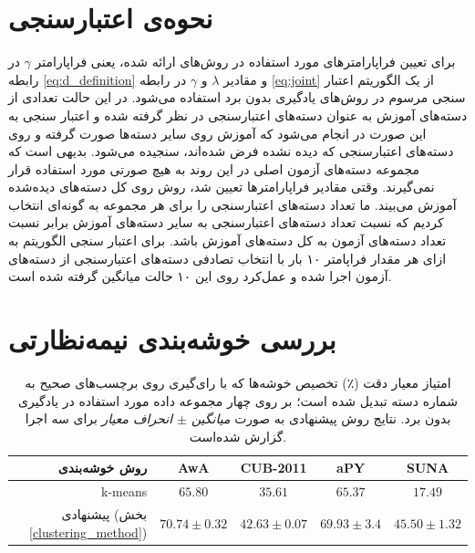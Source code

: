 \section{نحوه‌ی اعتبارسنجی}\label{exp:validation}
برای تعیین فراپارامترهای مورد استفاده در روش‌های ارائه شده، یعنی فراپارامتر $\gamma$ در رابطه \eqref{eq:d_definition} و مقادیر $\lambda$ و $\gamma$ در رابطه \eqref{eq:joint} از یک الگوریتم اعتبار سنجی مرسوم در روش‌های یادگیری بدون برد استفاده می‌شود.
در این حالت تعدادی از دسته‌های آموزش به عنوان دسته‌های اعتبارسنجی در نظر گرفته شده و اعتبار سنجی به این صورت در انجام می‌شود که آموزش روی سایر دسته‌ها صورت گرفته و روی دسته‌های اعتبارسنجی که دیده نشده فرض شده‌اند، سنجیده می‌شود. بدیهی است که مجموعه‌ دسته‌های آزمون اصلی در این روند به هیچ صورتی مورد استفاده قرار نمی‌گیرند. وقتی مقادیر فراپارامترها تعیین شد، روش روی کل دسته‌های دیده‌شده آموزش می‌بیند. ما تعداد دسته‌های اعتبارسنجی را برای هر مجموعه به گونه‌ای انتخاب کردیم که نسبت تعداد دسته‌های اعتبارسنجی به سایر دسته‌های آموزش برابر نسبت تعداد دسته‌های آزمون به کل دسته‌های آموزش باشد. برای اعتبار سنجی الگوریتم به ازای هر مقدار فراپامتر ۱۰ بار با انتخاب تصادفی دسته‌های اعتبارسنجی از دسته‌های آزمون اجرا شده و عمل‌کرد روی این ۱۰ حالت میانگین گرفته شده است.
%
\section{بررسی خوشه‌بندی نیمه‌نظارتی}\label{exp:cluster}
\begin{table}[ht]
\centering
\caption[بررسی عمل‌کرد خوشه‌بندی نیمه‌نظارتی پیشنهاتی]{
امتیاز معیار دقت (٪) تخصیص خوشه‌ها که با رای‌گیری روی برچسب‌های صحیح به شماره دسته تبدیل شده است؛ بر روی چهار مجموعه داده مورد استفاده در یادگیری بدون برد. نتایج روش پیشنهادی به صورت 
\textit{ میانگین $\pm$ انحراف معیار }
برای سه اجرا گزارش شده‌است.}
 \vspace{2mm} \label{tab:clustering}
\begin{tabular}{|r|c|c|c|c|}
\hline
روش خوشه‌بندی & AwA & CUB-2011 & aPY & SUNA \\
\hline
k-means                             &  ${65.80}$                 & ${35.61}$           & ${65.37 }$               & ${17.49 }$   \\
\hline
پیشنهادی (بخش \ref{clustering_method})
                      & \textbf{${70.74\pm 0.32}$}  & \textbf{${42.63\pm 0.07}$} & \textbf{${69.93\pm 3.4}$} & \textbf{ ${45.50 \pm 1.32}$} \\
\hline
\end{tabular}
\vspace{2mm}
\end{table}

